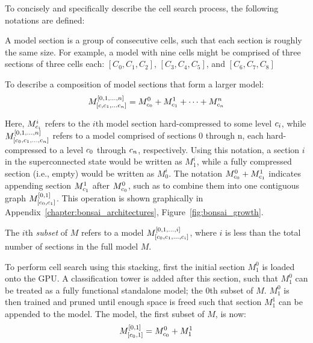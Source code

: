 \vspace{2em}
\noindent To concisely and specifically describe the cell search process, the following notations are defined:
\begin{definition}
	A model section is a group of consecutive cells, such that each section is roughly the same size. For example,
	a model with nine cells might be comprised of three sections of three cells each: $[C_0, C_1, C_2]$, $[C_3, C_4,C_5]$, and $[C_6,C_7,C_8]$
\end{definition}
\begin{definition}
	To describe a composition of model sections that form a larger model:
	\begin{align}
		M^{[0,1,\dots,n]}_{[c,c_1,\dots c_n]} = M^0_{c_0} + M^1_{c_1} + \dots + M^n_{c_n}
	\end{align}

	\noindent Here, $M^i_{c_i}$ refers to the $i$th model section hard-compressed to some level $c_i$, while
	$M^{[0,1,\dots,n]}_{[c_0,c_1,\dots,c_n]}$ refers to a model comprised of sections 0 through n, each hard-compressed to a level
	$c_0$ through $c_n$, respectively. Using this notation, a section $i$ in the superconnected state would be written as
	$M^i_1$, while a fully compressed section (i.e., empty) would be written as $M^i_0$. The notation $M^0_{c_0} + M^1_{c_1}$
	indicates appending section $M^1_{c_1}$ after $M^0_{c_0}$, such as to combine them into one contiguous graph $M^{[0,1]}_{[c_0, c_1]}$. This
	operation is shown graphically in Appendix~\ref{chapter:bonsai_architectures}, Figure~\ref{fig:bonsai_growth}.
\end{definition} \label{def:model_sections}


\begin{definition}
	The $i$th \textit{subset} of $M$ refers to a model $M^{[0,1,\dots,i]}_{[c_0,c_1,\dots,c_i]}$,
	where $i$ is less than the total number of sections in the full model $M$.
\end{definition}


To perform cell search using this stacking, first the initial section $M^0_1$ is loaded onto the GPU. A classification tower
is added after this section, such that $M^0_1$ can be treated as a fully functional standalone model; the $0$th subset of
$M$. $M^0_1$ is then trained and
pruned until enough space is freed such that section $M^1_1$ can be appended to the model. The model, the first subset of $M$, is now:
\begin{align}
M^{[0,1]}_{[c_0,1]} = M^{0}_{c_0} + M^{1}_{1}
\end{align}

